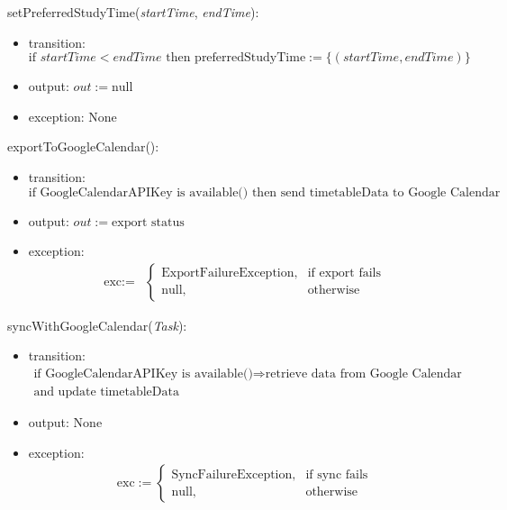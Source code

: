 \documentclass[12pt, titlepage]{article}
\begin{document}
\noindent setPreferredStudyTime(\textit{startTime}, \textit{endTime}):
\begin{itemize}
\item transition: 
\[
\text{if } \textit{startTime} < \textit{endTime} \text{ then } \text{preferredStudyTime} := \{(\textit{startTime}, \textit{endTime})\}
\]
\item output: \( out := \text{null} \)
\item exception: None
\end{itemize}

\noindent exportToGoogleCalendar():
\begin{itemize}
\item transition: 
\[
\text{if GoogleCalendarAPIKey is available()} \text{ then send } \text{timetableData} \text{ to Google Calendar}
\]
\item output: \( out := \text{export status} \)
\item exception: 
\[
\begin{array}{ll}
\text{exc} := & \begin{cases}
\text{ExportFailureException}, & \text{if export fails} \\
\text{null}, & \text{otherwise}
\end{cases}
\end{array}
\]
\end{itemize}

\noindent syncWithGoogleCalendar(\textit{Task}):
\begin{itemize}
\item transition: 
\[
\begin{array}{l}
\text{if GoogleCalendarAPIKey is available()} \Rightarrow \text{retrieve data from Google Calendar} \\
\text{and update timetableData}
\end{array}
\]
\item output: None
\item exception: 
\[
\begin{array}{l}
\text{exc} := \begin{cases}
\text{SyncFailureException}, & \text{if sync fails} \\
\text{null}, & \text{otherwise}
\end{cases}
\end{array}
\]
\end{itemize}
\end{document}
